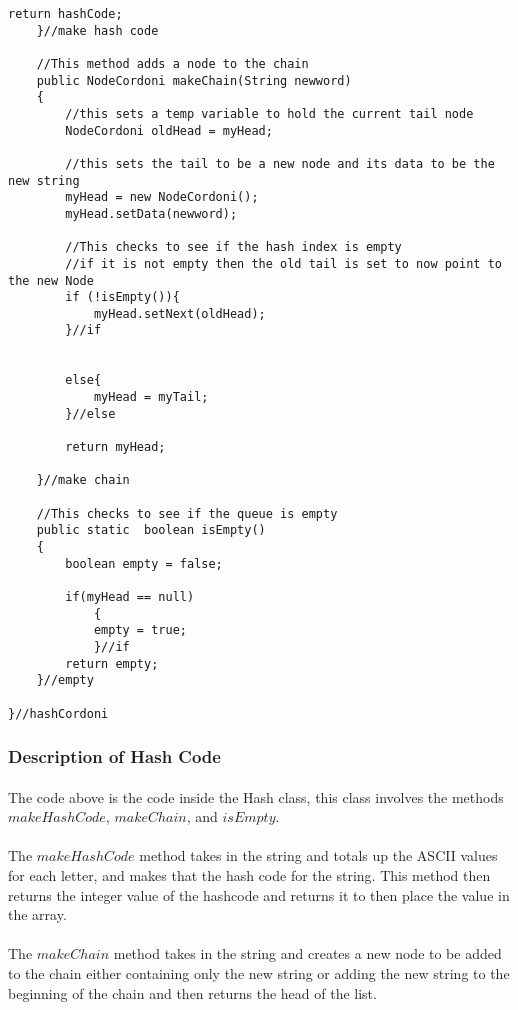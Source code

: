 \documentclass[letterpaper, 10pt,DIV=13]{scrartcl}
\numberwithin{equation}{section} %
\numberwithin{figure}{section} %
\numberwithin{table}{section} %
\begin{document}
\begin{lstlisting}[frame=single, ]
        return hashCode;
    }//make hash code

    //This method adds a node to the chain
    public NodeCordoni makeChain(String newword)
    {	
        //this sets a temp variable to hold the current tail node
        NodeCordoni oldHead = myHead;

        //this sets the tail to be a new node and its data to be the new string
        myHead = new NodeCordoni();
        myHead.setData(newword);
            
        //This checks to see if the hash index is empty
        //if it is not empty then the old tail is set to now point to the new Node
        if (!isEmpty()){
            myHead.setNext(oldHead);		
        }//if
    
       
        else{
            myHead = myTail;
        }//else

        return myHead; 
    
    }//make chain

	//This checks to see if the queue is empty
	public static  boolean isEmpty()
	{
		boolean empty = false;
		
		if(myHead == null)
			{
			empty = true;
			}//if
		return empty;
	}//empty

}//hashCordoni

\end{lstlisting}

\subsubsection{Description of Hash Code}
\paragraph{} The code above is the code inside the Hash class, this class involves the methods $makeHashCode$, $makeChain$, and  $isEmpty$.

\paragraph{} The $makeHashCode$ method takes in the string and totals up the ASCII values for each letter, and makes that the hash code for the string. This method then returns the integer value of the hashcode and returns it to then place the value in the array. 

\paragraph{} The $makeChain$ method takes in the string and creates a new node to be added to the chain either containing only the new string or adding the new string to the beginning of the chain and then returns the head of the list. 
\end{document}
